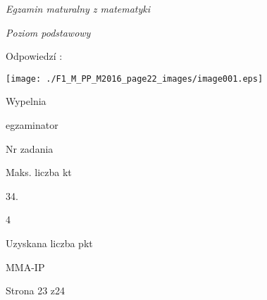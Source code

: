 \documentclass[a4paper,12pt]{article}
\begin{document}
{\it Egzamin maturalny z matematyki}

{\it Poziom podstawowy}

Odpowiedzí :
\begin{center}
\texttt{[image: ./F1\_M\_PP\_M2016\_page22\_images/image001.eps]}
\end{center}
Wypelnia

egzaminator

Nr zadania

Maks. liczba kt

34.

4

Uzyskana liczba pkt

MMA-IP

Strona 23 z24
\end{document}
